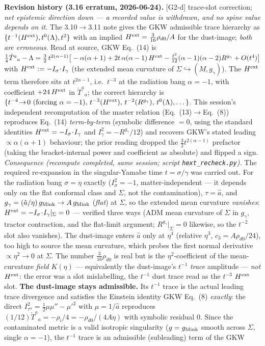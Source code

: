 \documentclass[11pt]{article}
\begin{document}
\smallskip\noindent\textbf{Revision history (3.16 erratum, 2026-06-24).} [G2-d] trace-slot correction; \emph{net epistemic direction down --- a recorded value is withdrawn, and no spine value depends on it}. The 3.10$\to$3.11 note gives the GKW admissible trace hierarchy as $\{t^{-1}(H^{\rm ext}),t^{0}(\Lambda),t^{2}\}$ with an implied $H^{\rm ext}=\tfrac{3}{16}\rho_{d0}/A$ for the dust-image; \emph{both are erroneous}. Read at source, GKW Eq.~(14) is $\tfrac14\check T^a{}_a-\Lambda=\tfrac32\,t^{2(\alpha-1)}\big[-\alpha(\alpha+1)+2t\,\alpha(\alpha-1)\,H^{\rm ext}-\tfrac{t^2}{12}(\alpha-1)(\alpha-2)R^{g_\gamma}+O(t^4)\big]$ with $H^{\rm ext}:=-I_\sigma\!\cdot\!I_\gamma$ (the extended mean curvature of $\Sigma\hookrightarrow(M,g_\gamma)$). The $H^{\rm ext}$ term therefore sits at $t^{2\alpha-1}$, i.e.\ $t^{-3}$ at the radiation bang $\alpha=-1$, with coefficient $+24\,H^{\rm ext}$ in $\check T^a{}_a$; the correct hierarchy is $\{t^{-4}\!\to\!0\ (\text{forcing }\alpha=-1),\,t^{-3}(H^{\rm ext}),\,t^{-2}(R^{g_\gamma}),\,t^{0}(\Lambda),\dots\}$. This session's independent recomputation of the master relation (Eq.~(13)$\to$Eq.~(8)) reproduces Eq.~(14) \emph{term-by-term} (symbolic difference $=0$, using the standard identities $H^{\rm ext}=-I_\sigma\!\cdot\!I_\gamma$ and $I_\gamma^2=-R^{g_\gamma}/12$) and recovers GKW's stated leading $\propto\alpha(\alpha+1)$ behaviour; the prior reading dropped the $\tfrac32 t^{2(\alpha-1)}$ prefactor (taking the bracket-internal power and coefficient as absolute) and flipped a sign. \emph{Consequence (recompute completed, same session; script \texttt{hext\_recheck.py}).} The required re-expansion in the singular-Yamabe time $t=\sigma/\gamma$ was carried out. For the radiation bang $\sigma=\eta$ exactly ($I_\sigma^2=-1$, matter-independent --- it depends only on the flat conformal class and $\Sigma$, not the contamination), $\tau=\hat a$, and $g_\gamma=(\hat a/\eta)\,g_{\rm Mink}\to A\,g_{\rm Mink}$ (\emph{flat}) at $\Sigma$, so the extended mean curvature \emph{vanishes}: $H^{\rm ext}=-I_\sigma\!\cdot\!I_\gamma|_\Sigma=0$ --- verified three ways (ADM mean curvature of $\Sigma$ in $g_\gamma$, tractor contraction, and the flat-limit argument; $R^{g_\gamma}|_\Sigma=0$ likewise, so the $t^{-2}$ slot also vanishes). The dust-image enters $\hat a$ only at $\eta^4$ (relative $\eta^3$, $c_3=A\rho_{d0}/24$), too high to source the mean curvature, which probes the first normal derivative $\propto\eta^2\!\to\!0$ at $\Sigma$. The number $\tfrac{3}{16}\rho_{d0}$ is real but is the $\eta^2$-coefficient of the mean-curvature \emph{field} $K(\eta)$ --- equivalently the dust-image's $t^{-1}$ \emph{trace} amplitude --- \emph{not} $H^{\rm ext}$: the error was a slot mislabelling, the $t^{-1}$ dust trace read as the $t^{-3}$ $H^{\rm ext}$ slot. \textbf{The dust-image stays admissible.} Its $t^{-1}$ trace is the actual leading trace divergence and satisfies the Einstein identity GKW Eq.~(8) \emph{exactly}: the direct $I^2_{\tau^\alpha}=\tfrac12\mu\mu''-\mu'^2$ with $\mu=1/\hat a$ reproduces $(1/12)\check T^a{}_a=-\rho_i/4=-\rho_{d0}/(4A\eta)$ with symbolic residual $0$. Since the contaminated metric is a valid isotropic singularity ($g=g_{\rm Mink}$ smooth across $\Sigma$, single $\alpha=-1$), the $t^{-1}$ trace is an admissible (subleading) term of the GKW 
\end{document}
